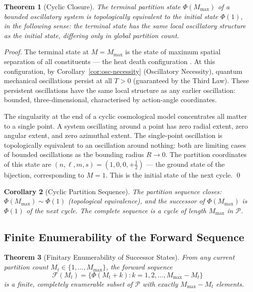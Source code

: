 \documentclass[twocolumn,10pt,a4paper]{article}
\theoremstyle{thmstyle}
\newtheorem{theorem}{Theorem}[section]
\newtheorem{corollary}[theorem]{Corollary}
\theoremstyle{definition}
\theoremstyle{remark}
\newcommand{\Parts}{\mathcal{P}}
\newcommand{\Mmax}{M_{\max}}
\newcommand{\PhiMap}{\varPhi}
\begin{document}
\begin{theorem}[Cyclic Closure]
\label{thm:cyclic}
The terminal partition state $\PhiMap(\Mmax)$ of a bounded oscillatory system is topologically equivalent to the initial state $\PhiMap(1)$, in the following sense: the terminal state has the same local oscillatory structure as the initial state, differing only in global partition count.
\end{theorem}

\begin{proof}
The terminal state at $M = \Mmax$ is the state of maximum spatial separation of all constituents --- the heat death configuration \citep{kelvin1852}. At this configuration, by Corollary~\ref{cor:osc-necessity} (Oscillatory Necessity), quantum mechanical oscillations persist at all $T > 0$ (guaranteed by the Third Law). These persistent oscillations have the same local structure as any earlier oscillation: bounded, three-dimensional, characterised by action-angle coordinates.

The singularity at the end of a cyclic cosmological model \citep{penrose2010} concentrates all matter to a single point. A system oscillating around a point has zero radial extent, zero angular extent, and zero azimuthal extent. The single-point oscillation is topologically equivalent to an oscillation around nothing: both are limiting cases of bounded oscillations as the bounding radius $R \to 0$. The partition coordinates of this state are $(n, \ell, m, s) = (1, 0, 0, +\tfrac{1}{2})$ --- the ground state of the bijection, corresponding to $M = 1$. This is the initial state of the next cycle. \qed
\end{proof}

\begin{corollary}[Cyclic Partition Sequence]
\label{cor:cyclic}
The partition sequence closes: $\PhiMap(\Mmax) \sim \PhiMap(1)$ (topological equivalence), and the successor of $\PhiMap(\Mmax)$ is $\PhiMap(1)$ of the next cycle. The complete sequence is a cycle of length $\Mmax$ in $\Parts$.
\end{corollary}

\subsection{Finite Enumerability of the Forward Sequence}

\begin{theorem}[Finitary Enumerability of Successor States]
\label{thm:finite-future}
From any current partition count $M_t \in \{1, \ldots, \Mmax\}$, the forward sequence
\begin{equation}
    \mathcal{F}(M_t) = \{ \PhiMap(M_t + k) : k = 1, 2, \ldots, \Mmax - M_t \}
    \label{eq:finite-future}
\end{equation}
is a finite, completely enumerable subset of $\Parts$ with exactly $\Mmax - M_t$ elements.
\end{theorem}
\end{document}
